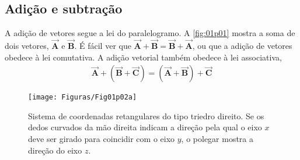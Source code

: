 \documentclass[
	12pt,				        %
	openright,			    %
	twoside,			      %
	a4paper,			      %
	chapter=TITLE,		  %
	section=TITLE,		  %
	subsection=TITLE,	  %
	subsubsection=TITLE,%
	english,			      %
	french,				      %
	brazil,				      %
	sumario=tradicional
]{abntex2}
\begin{document}
\subsection{Adição e subtração}

A adição de vetores segue a lei do paralelogramo. A \cref{fig:01p01} mostra a soma de dois vetores, $\bm{\vec{A}}$ e $\bm{\vec{B}}$. É fácil ver que $\bm{\vec{A}} + \bm{\vec{B}} = \bm{\vec{B}} + \bm{\vec{A}}$, ou que a adição de vetores obedece à lei comutativa. A adição vetorial também obedece à lei associativa,
\begin{align*}
	\bm{\vec{A}} + \left( \bm{\vec{B}} + \bm{\vec{C}} \right) = \left( \bm{\vec{A}} + \bm{\vec{B}} \right) + \bm{\vec{C}}
\end{align*}

\begin{figure}
	\centering
	\texttt{[image: Figuras/Fig01p02a]}
	\caption{Sistema de coordenadas retangulares do tipo triedro direito. Se os dedos curvados da mão direita indicam a direção pela qual o eixo $x$ deve ser girado para coincidir com o eixo $y$, o polegar mostra a direção do eixo $z$.}
	\label{fig:01p02}
\end{figure}
\postextual %




\end{document}
